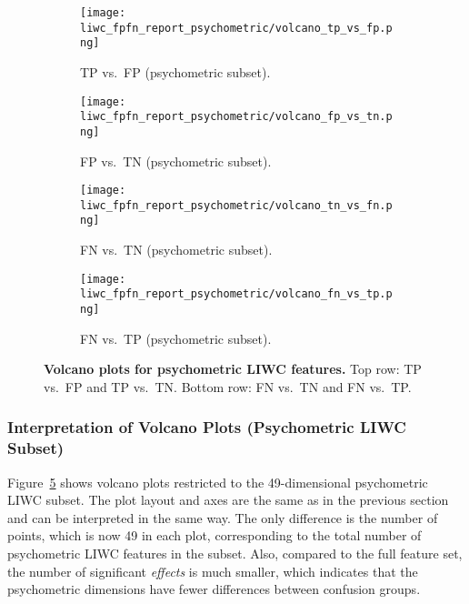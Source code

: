 \begin{figure}[H]
  \centering
  
  \begin{subfigure}[t]{0.49\textwidth}
    \centering
    \texttt{[image: liwc\_fpfn\_report\_psychometric/volcano\_tp\_vs\_fp.png]}
    \caption{TP vs.\ FP (psychometric subset).}
    \label{fig:volcano_psycho_tp_vs_fp}
  \end{subfigure}\hfill
  \begin{subfigure}[t]{0.49\textwidth}
    \centering
    \texttt{[image: liwc\_fpfn\_report\_psychometric/volcano\_fp\_vs\_tn.png]}
    \caption{FP vs.\ TN (psychometric subset).}
    \label{fig:volcano_psycho_tp_vs_tn}
  \end{subfigure}
  
  \vspace{0.5cm}
  
  \begin{subfigure}[t]{0.49\textwidth}
    \centering
    \texttt{[image: liwc\_fpfn\_report\_psychometric/volcano\_tn\_vs\_fn.png]}
    \caption{FN vs.\ TN (psychometric subset).}
    \label{fig:volcano_psycho_fn_vs_tn}
  \end{subfigure}\hfill
  \begin{subfigure}[t]{0.49\textwidth}
    \centering
    \texttt{[image: liwc\_fpfn\_report\_psychometric/volcano\_fn\_vs\_tp.png]}
    \caption{FN vs.\ TP (psychometric subset).}
    \label{fig:volcano_psycho_fn_vs_tp}
  \end{subfigure}

  \caption[Volcano plots for psychometric LIWC features.]{\textbf{Volcano plots for psychometric LIWC features.} 
  Top row: TP vs.\ FP and TP vs.\ TN. Bottom row: FN vs.\ TN and FN vs.\ TP.}
  \label{fig:volcano_psycho_features}
\end{figure}

\subsubsection{Interpretation of Volcano Plots (Psychometric LIWC Subset)}

Figure~\ref{fig:volcano_psycho_features} shows volcano plots restricted to the 49-dimensional psychometric LIWC subset. The plot layout and axes are the same as in the previous section and can be interpreted in the same way. The only difference is the number of points, which is now 49 in each plot, corresponding to the total number of psychometric LIWC features in the subset. Also, compared to the full feature set, the number of significant \textit{effects} is much smaller, which indicates that the psychometric dimensions have fewer differences between confusion groups.

